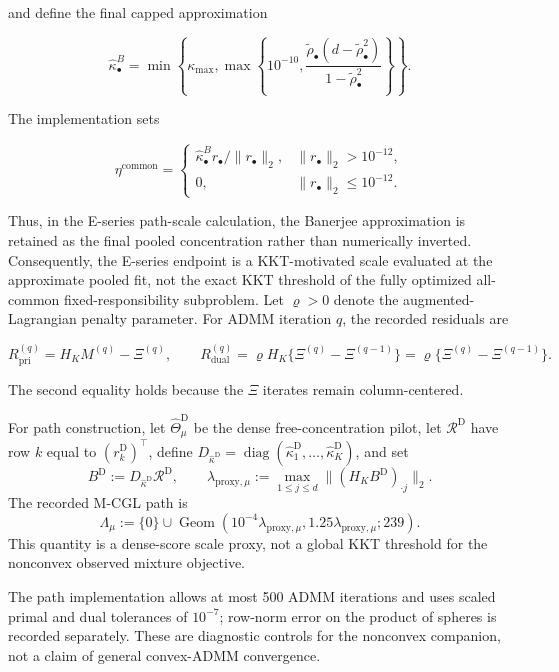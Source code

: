 \documentclass[preprint,12pt,authoryear]{elsarticle}
\begin{document}
and define the final capped approximation

\[
\widehat\kappa_\bullet^B
=\min\left\{
\kappa_{\max},
\max\left\{
10^{-10},
\frac{\widetilde\rho_\bullet
(d-\widetilde\rho_\bullet^2)}
{1-\widetilde\rho_\bullet^2}
\right\}
\right\}.
\]

The implementation sets

\[
\eta^{\mathrm{common}}
=
\begin{cases}
\widehat\kappa_\bullet^B
r_\bullet/\lVert r_\bullet\rVert_2,
& \lVert r_\bullet\rVert_2>10^{-12},\\[3pt]
0, & \lVert r_\bullet\rVert_2\leq10^{-12}.
\end{cases}
\]

Thus, in the E-series path-scale calculation, the Banerjee approximation is
retained as the final pooled concentration rather than numerically inverted.
Consequently, the E-series endpoint is a KKT-motivated scale evaluated at the
approximate pooled fit, not the exact KKT threshold of the fully optimized
all-common fixed-responsibility subproblem.
Let $\varrho>0$ denote the augmented-Lagrangian penalty parameter. For ADMM
iteration $q$, the recorded residuals are

\[
R_{\mathrm{pri}}^{(q)}=H_KM^{(q)}-\Xi^{(q)},
\qquad
R_{\mathrm{dual}}^{(q)}
=\varrho H_K\{\Xi^{(q)}-\Xi^{(q-1)}\}
=\varrho\{\Xi^{(q)}-\Xi^{(q-1)}\}.
\]

The second equality holds because the $\Xi$ iterates remain column-centered.

For path construction, let $\widehat\Theta^{\mathrm D}_\mu$ be the dense
free-concentration pilot, let $\mathcal R^{\mathrm D}$ have row $k$ equal to
$(r_k^{\mathrm D})^\top$, define
$D_{\widehat\kappa^{\mathrm D}}
=\operatorname{diag}(\widehat\kappa_1^{\mathrm D},\ldots,
\widehat\kappa_K^{\mathrm D})$, and set
\[
B^{\mathrm D}
:=D_{\widehat\kappa^{\mathrm D}}\mathcal R^{\mathrm D},
\qquad
\lambda_{\mathrm{proxy},\mu}
:=\max_{1\le j\le d}
\lVert(H_KB^{\mathrm D})_{\cdot j}\rVert_2.
\]
The recorded M-CGL path is
\[
\Lambda_\mu
:=\{0\}\cup
\operatorname{Geom}
\left(
10^{-4}\lambda_{\mathrm{proxy},\mu},
1.25\lambda_{\mathrm{proxy},\mu};239
\right).
\]
This quantity is a dense-score scale proxy, not a global KKT threshold for the
nonconvex observed mixture objective.

The path implementation allows at most 500 ADMM iterations and uses scaled
primal and dual tolerances of $10^{-7}$; row-norm error on the product of
spheres is recorded separately. These are diagnostic controls for the
nonconvex companion, not a claim of general convex-ADMM convergence.
\end{document}
